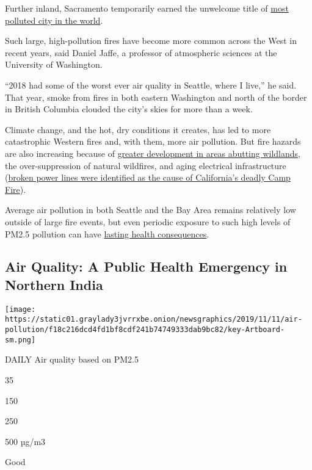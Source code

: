 Further inland, Sacramento temporarily earned the unwelcome title of
\href{https://www.wunderground.com/cat6/Smoke-Camp-Fire-Making-Sacramento-Most-Polluted-City-Earth}{most
polluted city in the world}.

Such large, high-pollution fires have become more common across the West
in recent years, said Daniel Jaffe, a professor of atmospheric sciences
at the University of Washington.

``2018 had some of the worst ever air quality in Seattle, where I
live,'' he said. That year, smoke from fires in both eastern Washington
and north of the border in British Columbia clouded the city's skies for
more than a week.

Climate change, and the hot, dry conditions it creates, has led to more
catastrophic Western fires and, with them, more air pollution. But fire
hazards are also increasing because of
\href{https://www.nytimes3xbfgragh.onion/2018/11/15/climate/california-fires-wildland-urban-interface.html}{greater
development in areas abutting wildlands}, the over-suppression of
natural wildfires, and aging electrical infrastructure
(\href{https://www.nytimes3xbfgragh.onion/interactive/2019/03/18/business/pge-california-wildfires.html}{broken
power lines were identified as the cause of California's deadly Camp
Fire}).

Average air pollution in both Seattle and the Bay Area remains
relatively low outside of large fire events, but even periodic exposure
to such high levels of PM2.5 pollution can have
\href{https://www.wired.com/story/the-health-effects-of-wildfire-smoke-may-last-a-lifetime/}{lasting
health consequences}.

\hypertarget{air-quality-a-public-health-emergency-in-northern-india}{%
\subsection{Air Quality: A Public Health Emergency in Northern
India}\label{air-quality-a-public-health-emergency-in-northern-india}}

\texttt{[image: https://static01.graylady3jvrrxbe.onion/newsgraphics/2019/11/11/air-pollution/f18c216dcd4fd1bf8cdf241b74749333dab9bc82/key-Artboard-sm.png]}

DAILY Air quality based on PM2.5

35

150

250

500 µg/m3

Good

